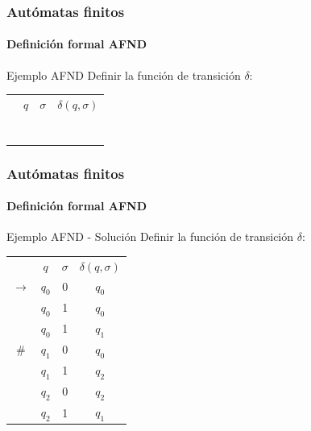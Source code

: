 \documentclass{beamer}
\begin{document}
        \begin{frame}
			\frametitle{Aut\'omatas finitos}
			\framesubtitle{Definici\'on formal AFND}

            \begin{exampleblock}{Ejemplo AFND}
               Definir la funci\'on de transici\'on $\delta$:
               
               \begin{center}
                   \begin{tabular}{c|ccc|} 
                   \cline{2-4}
                       & $q$ & $\sigma$ & $\delta(q,\sigma)$ \\ 
                   \cline{2-4}
                       & & & \\
                       & & & \\
                       & & & \\
                       & & & \\
                       & & & \\
                       & & & \\
                       & & & \\
                   \cline{2-4}
                   \end{tabular}
               \end{center}
            \end{exampleblock}
		\end{frame}

        \begin{frame}
			\frametitle{Aut\'omatas finitos}
			\framesubtitle{Definici\'on formal AFND}

            \begin{exampleblock}{Ejemplo AFND - Soluci\'on}
               Definir la funci\'on de transici\'on $\delta$:
               
               \begin{center}
                   \begin{tabular}{c|ccc|} 
                   \cline{2-4}
                       & $q$ & $\sigma$ & $\delta(q,\sigma)$ \\ 
                   \cline{2-4}
                       $\rightarrow$
                       & $q_{0}$ & 0 & $q_{0}$ \\
                       & $q_{0}$ & 1 & $q_{0}$ \\
                       & $q_{0}$ & 1 & $q_{1}$ \\
                       \# 
                       & $q_{1}$ & 0 & $q_{0}$ \\
                       & $q_{1}$ & 1 & $q_{2}$ \\
                       & $q_{2}$ & 0 & $q_{2}$ \\
                       & $q_{2}$ & 1 & $q_{1}$ \\
                   \cline{2-4}
                   \end{tabular}
               \end{center}
            \end{exampleblock}
		\end{frame}
\end{document}
